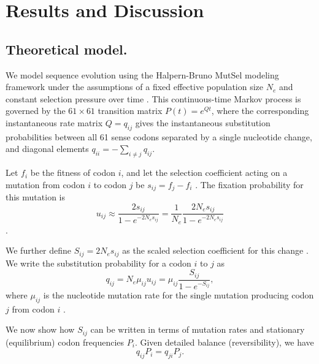 \documentclass[11pt]{article}
\begin{document}
		
\section*{Results and Discussion}
		
		
\subsection*{Theoretical model.}

We model sequence evolution using the Halpern-Bruno MutSel modeling framework under the assumptions of a fixed effective population size $N_e$ and constant selection pressure over time \cite{HalpernBruno1998,YangNielsen2008,Tamurietal2012,Thorne2012}. This continuous-time Markov process is governed by the $61 \times 61$ transition matrix $P(t) = e^{Qt}$, where the corresponding instantaneous rate matrix $Q = q_{ij}$ gives the instantaneous substitution probabilities between all 61 sense codons separated by a single nucleotide change, and diagonal elements $q_{ii} = -\sum_{i \neq j} q_{ij}$.

Let $f_i$ be the fitness of codon $i$, and let the selection coefficient acting on a mutation from codon $i$ to codon $j$ be $s_{ij} = f_j - f_i$ \cite{SellaHirsh2005,YangNielsen2008}. The fixation probability for this mutation is 
\begin{equation}\label{eq:u_ij}
u_{ij} \approx \frac{2s_{ij}}{1 - e^{-2N_es_{ij}}} = \frac{1}{N_e}\frac{2N_es_{ij}}{1 - e^{-2N_es_{ij}}}
\end{equation} \cite{Kimura1962,HalpernBruno1998,YangNielsen2008}. 

We further define $S_{ij} = 2N_es_{ij}$ as the scaled selection coefficient for this change \cite{YangNielsen2008}. We write the substitution probability for a codon $i$ to $j$ as
\begin{equation}\label{eq:q_ij}
q_{ij} = N_e\mu_{ij}u_{ij} = \mu_{ij}\frac{S_{ij}}{1 - e^{-S_{ij}}} , 
\end{equation} where $\mu_{ij}$ is the nucleotide mutation rate for the single mutation producing codon $j$ from codon $i$ \cite{HalpernBruno1998,SellaHirsh2005}.

We now show how $S_{ij}$ can be written in terms of mutation rates and stationary (equilibrium) codon frequencies $P_i$. Given detailed balance (reversibility), we have 
\begin{equation}\label{eq:DB}
q_{ij}P_i = q_{ji}P_j .
\end{equation} 
\end{document}
